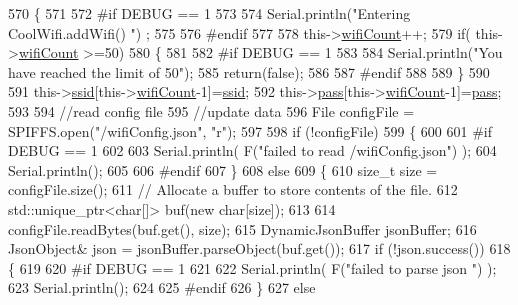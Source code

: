 \begin{DoxyCode}
570 \{
571 
572 \textcolor{preprocessor}{#if DEBUG == 1}
573     
574     Serial.println(\textcolor{stringliteral}{"Entering CoolWifi.addWifi() "}) ;
575 
576 \textcolor{preprocessor}{#endif  }
577     
578     this->\hyperlink{class_cool_wifi_ab133bd92fcb895b884deecd6678592e4}{wifiCount}++;
579     \textcolor{keywordflow}{if}( this->\hyperlink{class_cool_wifi_ab133bd92fcb895b884deecd6678592e4}{wifiCount} >=50)
580     \{
581     
582 \textcolor{preprocessor}{    #if DEBUG == 1}
583 
584         Serial.println(\textcolor{stringliteral}{"You have reached the limit of 50"});
585         \textcolor{keywordflow}{return}(\textcolor{keyword}{false});  
586     
587 \textcolor{preprocessor}{    #endif}
588 
589     \}
590 
591     this->\hyperlink{class_cool_wifi_a893b21d0fed821438733bba2e73fb4c2}{ssid}[this->\hyperlink{class_cool_wifi_ab133bd92fcb895b884deecd6678592e4}{wifiCount}-1]=\hyperlink{class_cool_wifi_a893b21d0fed821438733bba2e73fb4c2}{ssid};
592     this->\hyperlink{class_cool_wifi_a0c3332a149245aaad060b32593a54c9b}{pass}[this->\hyperlink{class_cool_wifi_ab133bd92fcb895b884deecd6678592e4}{wifiCount}-1]=\hyperlink{class_cool_wifi_a0c3332a149245aaad060b32593a54c9b}{pass};
593     
594     \textcolor{comment}{//read config file}
595     \textcolor{comment}{//update data}
596     File configFile = SPIFFS.open(\textcolor{stringliteral}{"/wifiConfig.json"}, \textcolor{stringliteral}{"r"});
597 
598     \textcolor{keywordflow}{if} (!configFile) 
599     \{
600     
601 \textcolor{preprocessor}{    #if DEBUG == 1 }
602 
603         Serial.println( F(\textcolor{stringliteral}{"failed to read /wifiConfig.json"}) );
604         Serial.println();
605 
606 \textcolor{preprocessor}{    #endif}
607     \}
608     \textcolor{keywordflow}{else}
609     \{
610         \textcolor{keywordtype}{size\_t} size = configFile.size();
611         \textcolor{comment}{// Allocate a buffer to store contents of the file.}
612         std::unique\_ptr<char[]> buf(\textcolor{keyword}{new} \textcolor{keywordtype}{char}[size]);
613 
614         configFile.readBytes(buf.get(), size);
615         DynamicJsonBuffer jsonBuffer;
616         JsonObject& json = jsonBuffer.parseObject(buf.get());
617         \textcolor{keywordflow}{if} (!json.success()) 
618         \{
619         
620 \textcolor{preprocessor}{        #if DEBUG == 1 }
621 
622             Serial.println( F(\textcolor{stringliteral}{"failed to parse json "}) );
623             Serial.println();
624         
625 \textcolor{preprocessor}{        #endif}
626         \} 
627         \textcolor{keywordflow}{else}

\end{DoxyCode}

